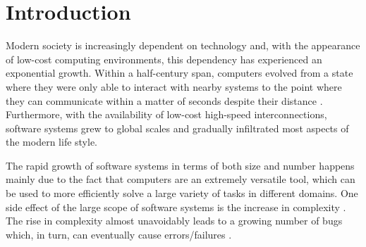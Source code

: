 \renewcommand{\BrainFuckChapter}{%
  {-}{[}{-}{-}{-}{-}{-}{-}{-}{>}{+}{<}{]}{>}{.}{+}{[}{-}{-}{-}{>}{+}{<}{]}{>}{.}{+}{+}{+}{+}{+}{+}{.}{-}{-}{.}{-}{-}{-}{.}{-}{-}{-}{-}{-}{-}{-}{-}{-}{-}{-}{.}{-}{-}{[}{-}{-}{-}{>}{+}{<}{]}{>}{-}{.}{+}{[}{-}{>}{+}
  {+}{+}{<}{]}{>}{+}{.}{-}{[}{-}{-}{-}{>}{+}{<}{]}{>}{-}{-}{.}{-}{-}{-}{-}{-}{-}{-}{-}{-}{-}{-}{.}{+}{+}{+}{+}{+}{+}{.}{-}{.}{-}{>}{<}{>}{>}{+}{+}{>}{>}{+}{<}{-}{-}{>}{-}{<}{<}{+}{<}{>}{>}{+}{>}{-}{<}{<}{-}{+}{+}
  {-}{>}{-}{-}{+}{+}{<}{>}{+}{-}{<}{>}{+}{>}{<}{>}{-}{<}{>}{<}{-}{+}{-}{<}{+}{>}{>}{<}{>}{-}{-}{-}{-}{>}{>}{<}{-}{>}{+}{-}{-}{<}{<}{>}{-}{>}{-}{>}{>}{<}{<}{-}{-}{+}{<}{<}{+}{-}{<}{>}{<}{+}{+}{-}{<}{+}{<}{<}{-}{<}
}
\renewcommand{\LifeChapter}{y}


\chapter{Introduction}
\label{sec:introduction}

Modern society is increasingly dependent on technology and, with the
appearance of low-cost computing environments, this dependency has
experienced an exponential growth.
%
Within a half-century span, computers evolved from a state where they
were only able to interact with nearby systems to the point where they
can communicate within a matter of seconds despite their distance
\cite{Allan01,Polsson}.
%
Furthermore, with the availability of low-cost high-speed
interconnections, software systems grew to global scales and gradually
infiltrated most aspects of the modern life style.

The rapid growth of software systems in terms of both size and number
happens mainly due to the fact that computers are an extremely
versatile tool, which can be used to more efficiently solve a large
variety of tasks in different domains.
%
One side effect of the large scope of software systems is the increase
in complexity \cite{Horn01}.
%
The rise in complexity almost unavoidably leads to a growing number of
bugs which, in turn, can eventually cause errors/failures
\cite{Salehie05}.


